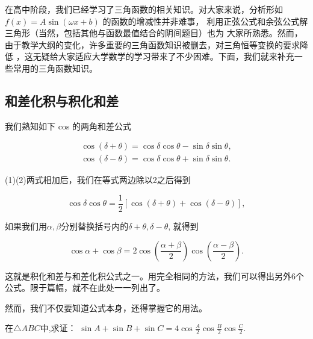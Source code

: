 在高中阶段，我们已经学习了三角函数的相关知识。对大家来说，分析形如$f(x)=A\sin(\omega x+b) $
的函数的增减性并非难事，%
利用正弦公式和余弦公式解三角形（当然，包括其他与函数最值结合的阴间题目）也为
大家所熟悉。然而，由于教学大纲的变化，许多重要的三角函数知识被删去，对三角恒等变换的要求降低
，这无疑给大家适应大学数学的学习带来了不少困难。下面，我们就来补充一些常用的三角函数知识。
\subsection{和差化积与积化和差}
\label{积化和差}

我们熟知如下 cos 的两角和差公式

\begin{gather}
    \cos(\delta +\theta )=\cos \delta  \cos \theta -\sin \delta  \sin \theta,\\
    \cos (\delta -\theta )=\cos \delta  \cos \theta +\sin \delta  \sin \theta.
\end{gather}

(1)(2)两式相加后，我们在等式两边除以2之后得到

\begin{equation}
    \cos \delta  \cos \theta=\frac{1}{2}[\cos(\delta +\theta )+\cos (\delta -\theta )],
\end{equation}

如果我们用$\alpha,\beta$分别替换括号内的$\delta +\theta,\delta -\theta$, 就得到

\begin{equation}
    \cos \alpha + \cos \beta = 2\cos\left( \frac{\alpha+\beta}{2} \right) \cos\left( \frac{\alpha-\beta}{2} \right) .
\end{equation}

这就是积化和差与和差化积公式之一。用完全相同的方法，我们可以得出另外6个公式。限于篇幅，就不在此处一一列出了。

然而，我们不仅要知道公式本身，还得掌握它的用法。

\begin{example}
    在$\bigtriangleup ABC $中,求证：%
    $\sin A+\sin B+\sin C=4\cos \frac{A}{2}\cos \frac{B}{2}\cos \frac{C}{2}$.
\end{example}

